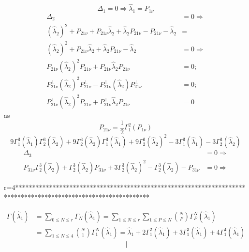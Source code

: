 \documentclass[aps,preprint]{revtex4}%
\begin{document}
\begin{equation}
\Delta_{1}=0\Rightarrow\hat{\lambda}_{1}=P_{1\nu}%
\end{equation}%
\begin{align}
\Delta_{2}  & =0\Rightarrow\nonumber\\
\left(  \hat{\lambda}_{2}\right)  ^{2}+P_{21\nu}+P_{21\nu}\hat{\lambda}%
_{2}+\hat{\lambda}_{2}P_{21\nu}-P_{21\nu}-\hat{\lambda}_{2}  & =\nonumber\\
\left(  \hat{\lambda}_{2}\right)  ^{2}+P_{21\nu}\hat{\lambda}_{2}+\hat
{\lambda}_{2}P_{21\nu}-\hat{\lambda}_{2}  & =0\Rightarrow\nonumber\\
P_{21\nu}\left(  \hat{\lambda}_{2}\right)  ^{2}P_{21\nu}+P_{21\nu}\hat
{\lambda}_{2}P_{21\nu}  & =0;\\
P_{21\nu}^{\perp}\left(  \hat{\lambda}_{2}\right)  ^{2}P_{21\nu}^{\perp
}-P_{21\nu}^{\perp}\left(  \hat{\lambda}_{2}\right)  P_{21\nu}^{\perp}  &
=0;\\
P_{21\nu}^{\perp}\left(  \hat{\lambda}_{2}\right)  ^{2}P_{21\nu}+P_{21\nu
}^{\perp}\hat{\lambda}_{2}P_{21\nu}  & =0
\end{align}
as%
\begin{equation}
P_{21\nu}=\frac{1}{2}\Gamma_{1}^{2}\left(  P_{1\nu}\right)
\end{equation}%
\begin{equation}
9\Gamma_{1}^{3}\left(  \hat{\lambda}_{1}\right)  \Gamma_{2}^{3}\left(
\hat{\lambda}_{2}\right)  +9\Gamma_{2}^{3}\left(  \hat{\lambda}_{2}\right)
\Gamma_{1}^{3}\left(  \hat{\lambda}_{1}\right)  +9\Gamma_{2}^{3}\left(
\hat{\lambda}_{2}\right)  ^{2}-3\Gamma_{1}^{3}\left(  \hat{\lambda}%
_{1}\right)  -3\Gamma_{2}^{3}\left(  \hat{\lambda}_{2}\right)
\end{equation}%
\begin{align}
\Delta_{3}  & =0\Rightarrow\nonumber\\
P_{31\nu}\Gamma_{2}^{3}\left(  \hat{\lambda}_{2}\right)  +\Gamma_{2}%
^{3}\left(  \hat{\lambda}_{2}\right)  P_{31\nu}+3\Gamma_{2}^{3}\left(
\hat{\lambda}_{2}\right)  ^{2}-\Gamma_{2}^{3}\left(  \hat{\lambda}_{2}\right)
-P_{31\nu}  & =0\Rightarrow\nonumber
\end{align}


\bigskip r=4***************************************************************************************************************

\bigskip%
\begin{align}
\Gamma\left(  \hat{\lambda}_{1}\right)    & =\sum_{0\leq N\leq r}\Gamma
_{N}\left(  \hat{\lambda}_{1}\right)  =\sum_{1\leq N\leq r}\sum_{1\leq P\leq
N}\binom{N}{P}\Gamma_{P}^{N}\left(  \hat{\lambda}_{1}\right)  \nonumber\\
& =\sum_{1\leq N\leq4}\binom{N}{1}\Gamma_{1}^{N}\left(  \hat{\lambda}%
_{1}\right)  =\hat{\lambda}_{1}+2\Gamma_{1}^{2}\left(  \hat{\lambda}%
_{1}\right)  +3\Gamma_{1}^{3}\left(  \hat{\lambda}_{1}\right)  +4\Gamma
_{1}^{4}\left(  \hat{\lambda}_{1}\right)
\end{align}%
\[
\parallel
\]
%
\end{document}
